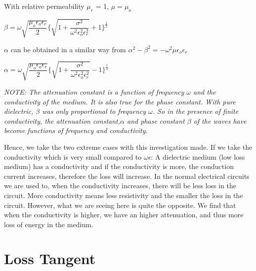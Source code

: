 With relative permeability $\mu_{r}$ = 1, $\mu = \mu_{o}$

\begin{center}
$\beta = \omega\sqrt{\dfrac{\mu_{o}\epsilon_{o}\epsilon_{r}}{2}}\Bigg\{{\sqrt{1 + \dfrac{\sigma^{2}}{\omega^{2}\epsilon_{o}^{2}\epsilon_{r}^{2}}}} + 1\Bigg\}^{\frac{1}{2}}$
\end{center}

$\alpha$ can be obtained in a similar way from $\alpha^{2} - \beta^{2} = -\omega^{2}\mu\epsilon_{o}\epsilon_{r}$

\begin{center}
$\alpha = \omega\sqrt{\dfrac{\mu_{o}\epsilon_{o}\epsilon_{r}}{2}}\Bigg\{{\sqrt{1 + \dfrac{\sigma^{2}}{\omega^{2}\epsilon_{o}^{2}\epsilon_{r}^{2}}}} - 1\Bigg\}^{\frac{1}{2}}$
\end{center}

\textit{NOTE: The attenuation constant is a function of frequency $\omega$ and the conductivity of the medium. It is also true for the phase constant. With pure dielectric, $\beta$ was only proportional to frequency $\omega$. So in the presence of finite conductivity, the attenuation constant,$\alpha$ and phase constant $\beta$ of the waves have become functions of frequency and conductivity.}

Hence, we take the two extreme cases with this investigation made.
If we take the conductivity which is very small compared to $\omega\epsilon$: A dielectric medium (low loss medium) has a conductivity and if the conductivity is more, the conduction current increases, therefore the loss will increase. In the normal electrical circuits we are used to, when the conductivity increases, there will be less loss in the circuit. More conductivity means less resistivity and the smaller the loss in the circuit. However, what we are seeing here is quite the opposite. We find that when the conductivity is higher, we have an higher attenuation, and thus more loss of energy in the medium.

\section{Loss Tangent}

